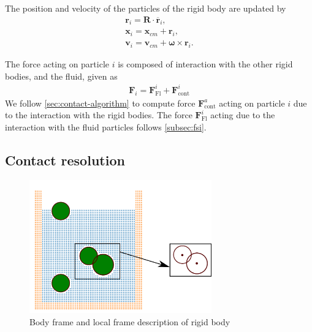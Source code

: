 \documentclass[preprint,12pt]{elsarticle}
\newcommand{\teng}[1]{\ensuremath{\boldsymbol{#1}}}
\newcommand{\ten}[1]{\ensuremath{\mathbf{#1}}}
\begin{document}
The position and velocity of the particles of the rigid body are updated by
\begin{eqnarray}
  \label{eq:rfc:rb_particle_pos_update}
  \ten{r}_i = \ten{R} \cdot \overline{\ten{r}}_{i},\\
  \ten{x}_i = \ten{x}_{cm} + \ten{r}_{i},\\
  \ten{v}_i = \ten{v}_{cm} + \teng{\omega} \times \ten{r}_{i}.
\end{eqnarray}

The force acting on particle $i$ is composed of interaction with the other rigid
bodies, and the fluid, given as
\begin{eqnarray}
  \label{eq:rfc:rb_particle_pos_update}
  \ten{F}_i = \ten{F}_{\text{Fl}}^i + \ten{F}_{\text{cont}}^i
\end{eqnarray}
We follow \cref{sec:contact-algorithm} to compute force
$\ten{F}_{\text{cont}}^a$ acting on particle $i$ due to the interaction with
the rigid bodies. The force $\ten{F}_{\text{Fl}}^i$ acting due to the
interaction with the fluid particles follows \cref{subsec:fsi}.



\FloatBarrier%
\subsection{Contact resolution}
\label{sec:dem}

\begin{figure}[!htpb]
  \centering
  \includegraphics[width=0.7\textwidth]{images/spherical_particles_dem_representation}
  \caption{Body frame and local frame description of rigid body}
  \label{fig:gloabl_body_frame_rb}
\end{figure}
\end{document}
